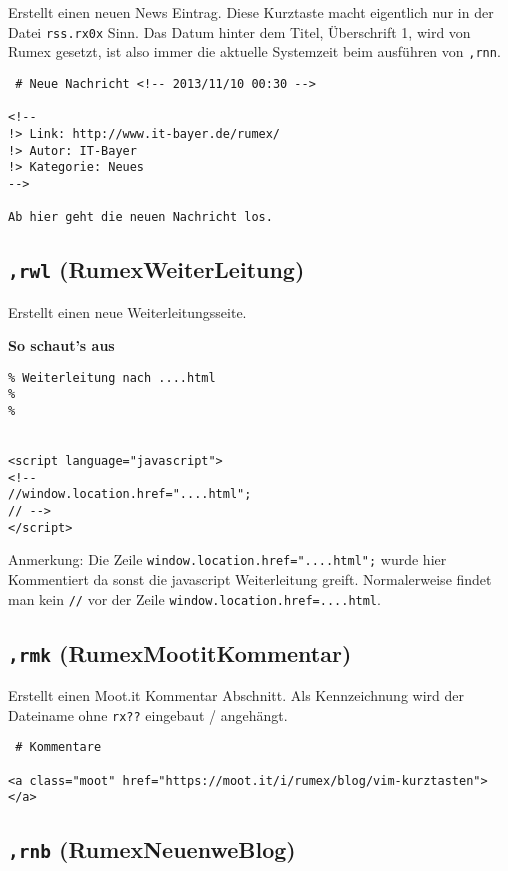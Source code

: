 Erstellt einen neuen News Eintrag. Diese Kurztaste macht eigentlich nur
in der Datei \texttt{rss.rx0x} Sinn. Das Datum hinter dem Titel,
Überschrift 1, wird von Rumex gesetzt, ist also immer die aktuelle
Systemzeit beim ausführen von \texttt{,rnn}.

\begin{verbatim}
 # Neue Nachricht <!-- 2013/11/10 00:30 -->

<!--
!> Link: http://www.it-bayer.de/rumex/
!> Autor: IT-Bayer
!> Kategorie: Neues
-->

Ab hier geht die neuen Nachricht los.
\end{verbatim}

\subsection{\texttt{,rwl}
(RumexWeiterLeitung)}\label{rwl-rumexweiterleitung}

Erstellt einen neue Weiterleitungsseite.

\textbf{So schaut's aus}

\begin{verbatim}
% Weiterleitung nach ....html
%
%


<script language="javascript">
<!--
//window.location.href="....html";
// -->
</script>
\end{verbatim}

Anmerkung: Die Zeile \texttt{window.location.href="....html";} wurde
hier Kommentiert da sonst die javascript Weiterleitung greift.
Normalerweise findet man kein \texttt{//} vor der Zeile
\texttt{window.location.href=....html}.

\subsection{\texttt{,rmk}
(RumexMootitKommentar)}\label{rmk-rumexmootitkommentar}

Erstellt einen Moot.it Kommentar Abschnitt. Als Kennzeichnung wird der
Dateiname ohne \texttt{rx??} eingebaut / angehängt.

\begin{verbatim}
 # Kommentare

<a class="moot" href="https://moot.it/i/rumex/blog/vim-kurztasten"></a>
\end{verbatim}

\subsection{\texttt{,rnb}
(RumexNeuenweBlog)}\label{rnb-rumexneuenweblog}

